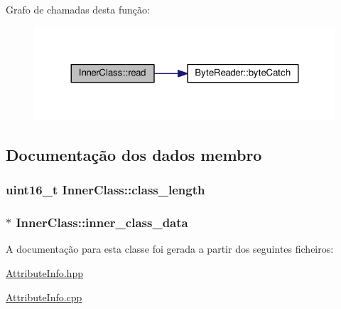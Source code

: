 Grafo de chamadas desta função\+:
\nopagebreak
\begin{figure}[H]
\begin{center}
\leavevmode
\includegraphics[width=324pt]{class_inner_class_ab178cb43a3277c1ade99a8a0c346cd49_cgraph}
\end{center}
\end{figure}




\subsection{Documentação dos dados membro}
\subsubsection[{\texorpdfstring{class\+\_\+length}{class_length}}]{\setlength{\rightskip}{0pt plus 5cm}uint16\+\_\+t Inner\+Class\+::class\+\_\+length}\hypertarget{class_inner_class_a7976c7530d97d879907ce035a9b7d2c7}{}\label{class_inner_class_a7976c7530d97d879907ce035a9b7d2c7}
\subsubsection[{\texorpdfstring{inner\+\_\+class\+\_\+data}{inner_class_data}}]{$\ast$ Inner\+Class\+::inner\+\_\+class\+\_\+data}\hypertarget{class_inner_class_ad9876452a134d1d5063223610dae7d6a}{}\label{class_inner_class_ad9876452a134d1d5063223610dae7d6a}


A documentação para esta classe foi gerada a partir dos seguintes ficheiros\+:\begin{DoxyCompactItemize}
\item 
\hyperlink{_attribute_info_8hpp}{Attribute\+Info.\+hpp}\item 
\hyperlink{_attribute_info_8cpp}{Attribute\+Info.\+cpp}\end{DoxyCompactItemize}
